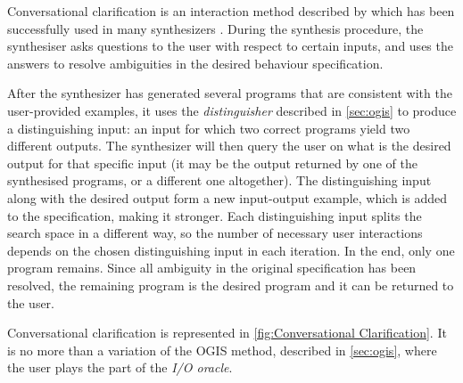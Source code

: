 
Conversational clarification is an interaction method described by \citeauthor{DBLP:conf/uist/MayerSGLMPSZG15} \cite{DBLP:conf/uist/MayerSGLMPSZG15} which has been successfully used in many synthesizers  \cite{DBLP:journals/pvldb/LiCM15,DBLP:journals/corr/abs-19,DBLP:conf/sigmod/WangCB17,DBLP:conf/pldi/WangCB17}.
During the synthesis procedure, the synthesiser asks questions to the user with respect to certain inputs, and uses the answers to resolve ambiguities in the desired behaviour specification. 

After the synthesizer has generated several programs that are consistent with the user-provided examples, it uses the \textit{distinguisher} described in \autoref{sec:ogis} to produce a distinguishing input: an input for which two correct programs yield two different outputs. The synthesizer will then query the user on what is the desired output for that specific input (it may be the output returned by one of the synthesised programs, or a different one altogether). The distinguishing input along with the desired output form a new input-output example, which is added to the specification, making it stronger. Each distinguishing input splits the search space in a different way, so the number of necessary user interactions depends on the chosen distinguishing input in each iteration. In the end, only one program remains. Since all ambiguity in the original specification has been resolved, the remaining program is the desired program and it can be returned to the user.

Conversational clarification is represented in \autoref{fig:Conversational Clarification}. It is no more than a variation of the \ac{OGIS} method, described in \autoref{sec:ogis}, where the user plays the part of the \textit{I/O oracle}.

